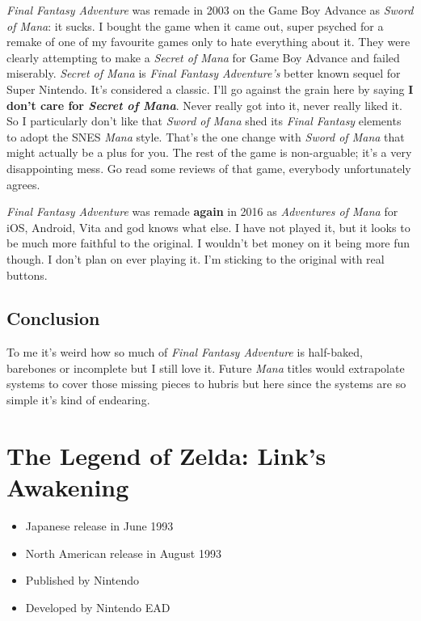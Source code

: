 \documentclass{book}
\begin{document}
\emph{Final Fantasy Adventure} was remade in 2003 on the Game Boy Advance as \emph{Sword of Mana}: it sucks. I bought the game when it came out, super psyched for a remake of one of my favourite games only to hate everything about it. They were clearly attempting to make a \emph{Secret of Mana} for Game Boy Advance and failed miserably. \emph{Secret of Mana} is \emph{Final Fantasy Adventure’s} better known sequel for Super Nintendo. It’s considered a classic. I’ll go against the grain here by saying \textbf{I don’t care for \emph{Secret of Mana}}. Never really got into it, never really liked it. So I particularly don’t like that \emph{Sword of Mana} shed its \emph{Final Fantasy} elements to adopt the SNES \emph{Mana} style. That’s the one change with \emph{Sword of Mana} that might actually be a plus for you. The rest of the game is non-arguable; it’s a very disappointing mess. Go read some reviews of that game, everybody unfortunately agrees.

\emph{Final Fantasy Adventure} was remade \textbf{again} in 2016 as \emph{Adventures of Mana} for iOS, Android, Vita and god knows what else. I have not played it, but it looks to be much more faithful to the original. I wouldn’t bet money on it being more fun though. I don’t plan on ever playing it. I’m sticking to the original with real buttons.

\FloatBarrier\needspace{5pt}\section*{Conclusion}\nopagebreak[4]

To me it’s weird how so much of \emph{Final Fantasy Adventure} is half-baked, barebones or incomplete but I still love it. Future \emph{Mana} titles would extrapolate systems to cover those missing pieces to hubris but here since the systems are so simple it’s kind of endearing.


\begingroup \chapter*{The Legend of Zelda: Link’s Awakening} \endgroup

\begin{itemize} \setlength\itemsep{-0.4em}
\item Japanese release in June 1993
\item North American release in August 1993
\item Published by Nintendo
\item Developed by Nintendo EAD
\end{itemize}\noindent
\end{document}
